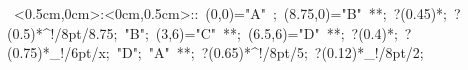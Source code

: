 %

\hbox{
\xy    <0.5cm,0cm>:<0cm,0.5cm>::
       (0,0)="A" ; (8.75,0)="B" **\dir{-}; 
       ?(0.45)*\dir{<<};  ?(0.5)*^!/8pt/{8.75};
       "B"; (3,6)="C" **\dir{-}; (6.5,6)="D" **\dir{-}; 
       ?(0.4)*\dir{<<};  ?(0.75)*_!/6pt/{x};
       "D";  "A" **\dir{-}; ?(0.65)*^!/8pt/{5}; 
       ?(0.12)*_!/8pt/{2};
       \endxy}
	   
